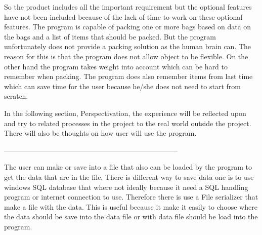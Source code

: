So the product includes all the important requirement but the optional features have not been included because of the lack of time to work on these optional features. The program is capable of packing one or more bags based on data on the bags and a list of items that should be packed. But the program unfortunately does not provide a packing solution as the human brain can. The reason for this is that the program does not allow object to be flexible. On the other hand the program takes weight into account which can be hard to remember when packing. The program does also remember items from last time which can save time for the user because he/she does not need to start from scratch.

In the following section, Perspectivation, the experience will be reflected upon and try to related processes in the project to the real world outside the project. There will also be thoughts on how user will use the program.

-------------------------------------------------------------------------- 

The user can make or save into a file that also can be loaded by the program to get the data that are in the file. There is different way to save data one is to use windows SQL database that where not ideally because it need a SQL handling program or internet connection to use. Therefore there is use a File serializer that make a file with the data. This is useful because it make it easily to choose where the data should be save into the data file or with data file should be load into the program.